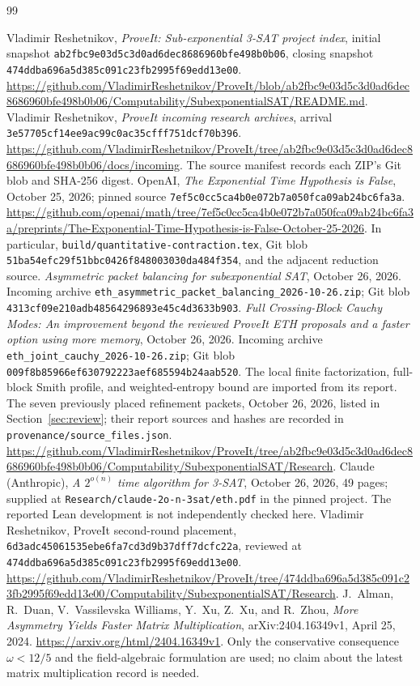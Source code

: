 \documentclass[11pt,letterpaper]{article}
\theoremstyle{definition}\newtheorem{definition}[theorem]{Definition}
\theoremstyle{remark}\newtheorem{remark}[theorem]{Remark}
\begin{document}
\begin{thebibliography}{99}
\raggedright
{} Vladimir Reshetnikov, \emph{ProveIt: Sub-exponential 3-SAT project
index}, initial snapshot \nolinkurl{ab2fbc9e03d5c3d0ad6dec8686960bfe498b0b06},
closing snapshot \nolinkurl{474ddba696a5d385c091c23fb2995f69edd13e00}.
\url{https://github.com/VladimirReshetnikov/ProveIt/blob/ab2fbc9e03d5c3d0ad6dec8686960bfe498b0b06/Computability/SubexponentialSAT/README.md}.
 Vladimir Reshetnikov, \emph{ProveIt incoming research archives},
arrival \nolinkurl{3e57705cf14ee9ac99c0ac35cfff751dcf70b396}.
\url{https://github.com/VladimirReshetnikov/ProveIt/tree/ab2fbc9e03d5c3d0ad6dec8686960bfe498b0b06/docs/incoming}.
The source manifest records each ZIP's Git blob and SHA-256 digest.
 OpenAI, \emph{The Exponential Time Hypothesis is False},
October 25, 2026; pinned source
\nolinkurl{7ef5c0cc5ca4b0e072b7a050fca09ab24bc6fa3a}.
\url{https://github.com/openai/math/tree/7ef5c0cc5ca4b0e072b7a050fca09ab24bc6fa3a/preprints/The-Exponential-Time-Hypothesis-is-False-October-25-2026}.
In particular, \nolinkurl{build/quantitative-contraction.tex}, Git blob
\nolinkurl{51ba54efc29f51bbc0426f848003030da484f354}, and the adjacent reduction source.
 \emph{Asymmetric packet balancing for subexponential SAT},
October 26, 2026. Incoming archive
\nolinkurl{eth_asymmetric_packet_balancing_2026-10-26.zip};
Git blob \nolinkurl{4313cf09e210adb48564296893e45c4d3633b903}.
 \emph{Full Crossing-Block Cauchy Modes: An improvement beyond the reviewed ProveIt ETH proposals and a faster option using more memory},
October 26, 2026. Incoming archive
\nolinkurl{eth_joint_cauchy_2026-10-26.zip};
Git blob \nolinkurl{009f8b85966ef630792223aef685594b24aab520}.
The local finite factorization, full-block Smith profile, and weighted-entropy bound
are imported from its report.
 The seven previously placed refinement packets, October 26, 2026,
listed in Section~\ref{sec:review}; their report sources and hashes are recorded in
\nolinkurl{provenance/source_files.json}.
\url{https://github.com/VladimirReshetnikov/ProveIt/tree/ab2fbc9e03d5c3d0ad6dec8686960bfe498b0b06/Computability/SubexponentialSAT/Research}.
 Claude (Anthropic), \emph{A $2^{o(n)}$ time algorithm for 3-SAT},
October 26, 2026, 49 pages; supplied at
\nolinkurl{Research/claude-2o-n-3sat/eth.pdf} in the pinned project.
The reported Lean development is not independently checked here.
 Vladimir Reshetnikov, ProveIt second-round placement,
\nolinkurl{6d3adc45061535ebe6fa7cd3d9b37dff7dcfc22a}, reviewed at
\nolinkurl{474ddba696a5d385c091c23fb2995f69edd13e00}.
\url{https://github.com/VladimirReshetnikov/ProveIt/tree/474ddba696a5d385c091c23fb2995f69edd13e00/Computability/SubexponentialSAT/Research}.
 J.~Alman, R.~Duan, V.~Vassilevska Williams, Y.~Xu, Z.~Xu, and
R.~Zhou, \emph{More Asymmetry Yields Faster Matrix Multiplication},
arXiv:2404.16349v1, April 25, 2024.
\url{https://arxiv.org/html/2404.16349v1}.
Only the conservative consequence $\omega<12/5$ and the field-algebraic formulation
are used; no claim about the latest matrix multiplication record is needed.
\end{thebibliography}
\end{document}
